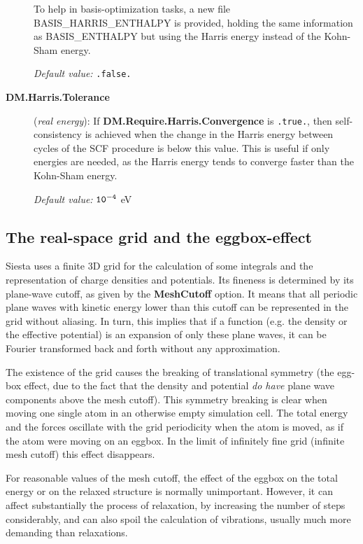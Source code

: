 \documentclass[11pt]{article}
\begin{document}
\begin{description}
To help in basis-optimization tasks, a new file BASIS\_HARRIS\_ENTHALPY
is provided, holding the same information as BASIS\_ENTHALPY but using
the Harris energy instead of the Kohn-Sham energy.

{\it Default value:} {\tt .false.}


\item[{\bf DM.Harris.Tolerance}] ({\it real energy}):
If {\bf DM.Require.Harris.Convergence} is {\tt .true.}, then
self-consistency is achieved when the change in the Harris energy between cycles
of the SCF procedure is below this value.
This is useful if only energies are needed, as the Harris energy tends
to converge faster than the Kohn-Sham energy.

{\it Default value:} {${\tt 10^{-4}}$ eV}

\end{description}

\vspace{5pt}
\subsection{The real-space grid and the eggbox-effect}

{\sc Siesta} uses a finite 3D grid for the calculation of some
integrals and the representation of charge densities and potentials.
Its fineness is determined by its plane-wave cutoff, as
given by the {\bf MeshCutoff} option. It means that all periodic
plane waves with kinetic energy lower than this cutoff 
can be represented in the grid without aliasing. In turn,
this implies that if a function (e.g. the density or the 
effective potential) is an expansion of
only these plane waves, it can be Fourier transformed
back and forth without any approximation.

The existence of the grid causes the breaking of translational
symmetry (the egg-box effect, due to the fact that the density
and potential {\it do have} plane wave components above
the mesh cutoff).  This symmetry breaking is clear when
moving one single atom in an otherwise empty simulation cell. The
total energy and the forces oscillate with the grid periodicity when
the atom is moved, as if the atom were moving on an eggbox. In the
limit of infinitely fine grid (infinite mesh cutoff) this effect
disappears.

For reasonable values of the mesh cutoff, the effect of the eggbox
on the total energy or on the relaxed structure is normally unimportant.
However, it can affect substantially the process of relaxation, by
increasing the number of steps considerably, and can also spoil the
calculation of vibrations, usually much more demanding than relaxations.
\end{document}
